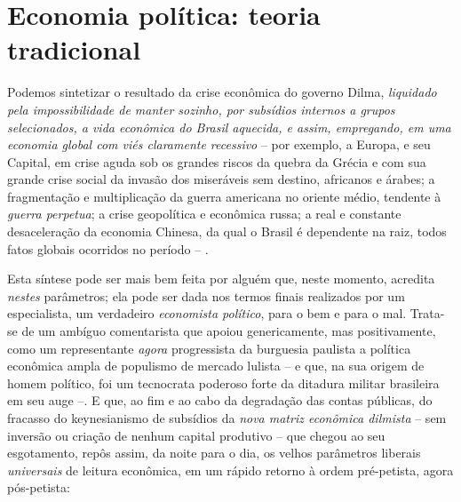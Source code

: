   \section{Economia política: teoria
  tradicional}\label{economia-poluxedtica-teoria-tradicional}

Podemos sintetizar o resultado da crise econômica do governo Dilma,
\emph{liquidado pela impossibilidade de manter sozinho, por subsídios
internos a grupos selecionados, a vida econômica do Brasil aquecida, e
assim, empregando, em uma economia global com viés claramente recessivo}
-- por exemplo, a Europa, e seu Capital, em crise aguda sob os grandes
riscos da quebra da Grécia e com sua grande crise social da invasão dos
miseráveis sem destino, africanos e árabes; a fragmentação e
multiplicação da guerra americana no oriente médio, tendente à
\emph{guerra perpetua}; a crise geopolítica e econômica russa; a real e
constante desaceleração da economia Chinesa, da qual o Brasil é
dependente na raiz, todos fatos globais ocorridos no período -- .

Esta síntese pode ser mais bem feita por alguém que, neste momento,
acredita \emph{nestes} parâmetros; ela pode ser dada nos termos finais
realizados por um especialista, um verdadeiro \emph{economista
político}, para o bem e para o mal. Trata-se de um ambíguo comentarista
que apoiou genericamente, mas positivamente, como um representante
\emph{agora} progressista da burguesia paulista a política econômica
ampla de populismo de mercado lulista -- e que, na sua origem de homem
político, foi um tecnocrata poderoso forte da ditadura militar
brasileira em seu auge --. E que, ao fim e ao cabo da degradação das
contas públicas, do fracasso do keynesianismo de subsídios da \emph{nova
matriz econômica dilmista} -- sem inversão ou criação de nenhum capital
produtivo -- que chegou ao seu esgotamento, repôs assim, da noite para o
dia, os velhos parâmetros liberais \emph{universais} de leitura
econômica, em um rápido retorno à ordem pré-petista, agora pós-petista:

